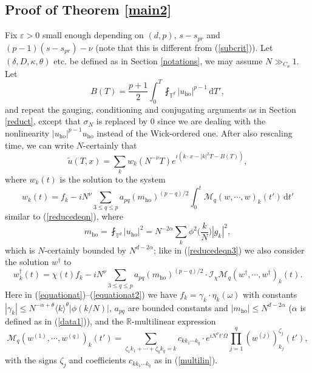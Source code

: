 \documentclass[11 pt,reqno]{amsart}
\theoremstyle{definition}
\theoremstyle{remark}
\numberwithin{equation}{section}
\newcommand{\Ic}{\mathcal{I}}
\renewcommand{\Mc}{\mathcal{M}}
\newcommand{\Tb}{\mathbb{T}}
\newcommand{\Rb}{\mathbb{R}}
\begin{document}
{ \subsection{Proof of Theorem \ref{main2}} Fix $\varepsilon>0$ small enough depending on $(d,p)$, $s-s_{pr}$ and $(p-1)(s-s_{pr})-\nu$ (note that this is different from (\ref{subcrit})). Let $(\delta,D,\kappa,\theta)$ etc. be defined as in Section \ref{notations}, we may assume $N\gg_{C_\theta}1$. Let
 \[B(T)=\frac{p+1}{2}\int_0^T\fint_{\Tb^d}|u_\mathrm{ho}|^{p-1}\,\mathrm{d}T',\] and repeat the gauging, conditioning and conjugating arguments as in Section \ref{reduct}, except that $\sigma_N$ is replaced by $0$ since we are dealing with the nonlinearity $|u_\mathrm{ho}|^{p-1}u_\mathrm{ho}$ instead of the Wick-ordered one. After also rescaling time, we can write $N$-certainly that
 \begin{equation}\label{formulauT}\widetilde{u}(T,x)=\sum_{k}w_k(N^{-\nu}T)e^{i(k\cdot x-|k|^2T-B(T))},\end{equation} where $w_k(t)$ is the solution to the system
 \begin{equation}\label{equationat}w_k(t)=f_k-iN^\nu\sum_{3\leq q\leq p}a_{pq}(m_\mathrm{ho})^{(p-q)/2}\int_0^t\Mc_q(w,\cdots,w)_k(t')\,\mathrm{d}t'
 \end{equation}
  similar to (\ref{reducedeqn}), where 
  \[m_\mathrm{ho}=\fint_{\Tb^d}|u_\mathrm{ho}|^2=N^{-2\alpha}\sum_{k}\phi^2\big(\frac{k}{N}\big)|g_k|^2,\]which is $N$-certainly bounded by $N^{d-2\alpha}$; like in (\ref{reducedeqn3}) we also consider the solution $w^\dagger$ to
 \begin{equation}\label{equationat2}w_k^\dagger(t)=\chi(t)f_k-iN^\nu\sum_{3\leq q\leq p}a_{pq}(m_\mathrm{ho})^{(p-q)/2}\cdot\Ic_\chi\Mc_q(w^\dagger,\cdots,w^\dagger)_k(t).
 \end{equation} Here in (\ref{equationat})--(\ref{equationat2}) we have $f_k=\gamma_k\cdot\eta_k(\omega)$ with constants $|\gamma_k|\leq N^{-\alpha+\theta}\langle k\rangle^\theta|\phi(k/N)|$, $a_{pq}$ are bounded constants and $|m_\mathrm{ho}|\leq N^{d-2\alpha}$ ($\alpha$ is defined as in (\ref{data1})), and the $\Rb$-multilinear expression
 \begin{equation}\label{multilinat}\Mc_q(w^{(1)},\cdots,w^{(q)})_k(t')=\sum_{\zeta_1k_1+\cdots+\zeta_qk_q=k}c_{kk_1\cdots k_q}\cdot e^{iN^\nu t'\Omega}\prod_{j=1}^q(w^{(j)})_{k_j}^{\zeta_j}(t'),
 \end{equation} with the signs $\zeta_j$ and coefficients $c_{kk_1\cdots k_q}$ as in (\ref{multilin}).
 
}
\end{document}
